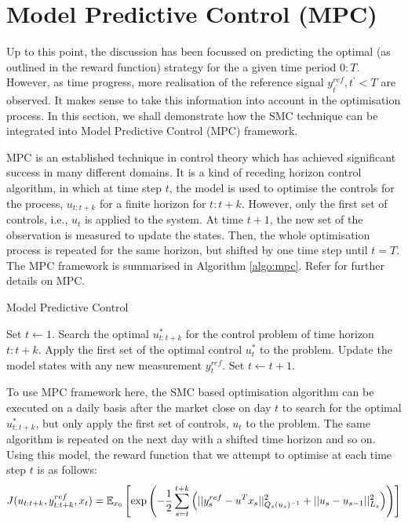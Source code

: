 \section{Model Predictive Control (MPC)}
Up to this point, the discussion has been focussed on predicting the optimal (as outlined in the reward function) strategy for the a given time period $0:T$. However, as time progress, more realisation of the reference signal $y^{ref}_{t^\prime}, t^\prime < T$ are observed. It makes sense to take this information into account in the optimisation process. In this section, we shall demonstrate how the SMC technique can be integrated into Model Predictive Control (MPC) framework.

MPC is an established technique in control theory which has achieved significant success in many different domains. It is a kind of receding horizon control algorithm, in which at time step $t$, the model is used to optimise the controls for the process, $u_{t:t+k}$ for a finite horizon for $t:t+k$. However, only the first set of controls, i.e., $u_{t}$ is applied to the system. At time $t+1$, the new set of the observation is measured to update the states. Then, the whole optimisation process is repeated for the same horizon, but shifted by one time step until $t=T$. The MPC framework is summarised in Algorithm \ref{algo:mpc}. Refer \cite{RJB09,MJM02} for further details on MPC. 

\begin{algorithm}
\caption{Model Predictive Control}\label{algo:mpc}
\begin{algorithmic}[1]
\State Set $t \gets 1$.
\State Search the optimal $u^*_{t:t+k}$ for the control problem of time horizon $t:t+k$.
\State Apply the first set of the optimal control  $u^*_{t}$ to the problem.
\State Update the model states with any new measurement $y^{ref}_t$.
\State Set $t \gets t + 1$.
\EndWhile
\EndFunction
\end{algorithmic}
\end{algorithm}

To use MPC framework here, the SMC based optimisation algorithm can be executed on a daily basis after the market close on day $t$ to search for the optimal $u^*_{t:t+k}$, but only apply the first set of controls, $u_t$ to the problem. The same algorithm is repeated on the next day with a shifted time horizon and so on. Using this model, the reward function that we attempt to optimise at each time step $t$ is as follows:
\begin{equation}
  J(u_{t:t+k},y^{ref}_{t:t+k}, x_t) = \operatorname{\mathbb{E}}_{x_0}\left[ \exp \left( -\dfrac{1}{2}\displaystyle\sum^{t+k}_{s=t}\left(\vert\vert y^{ref}_s - u^Tx_s \vert\vert^2_{Q_s(u_s)^{-1}}  + \vert\vert u_s - u_{s-1} \vert\vert^2_{L_s}\right) \right ) \right]
\label{eq:J2}
\end{equation}

